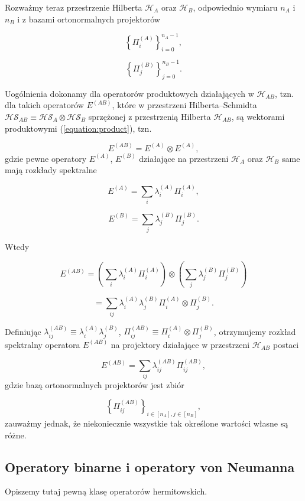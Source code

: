 Rozważmy teraz przestrzenie Hilberta $\mathcal{H}_{A}$ oraz $\mathcal{H}_{B}$, odpowiednio wymiaru $n_{A}$ i $n_{B}$ i z bazami ortonormalnych projektorów

$$
    \left\{\Pi_{i} ^ {(A)}\right\}_{i = 0} ^ {n_{A} - 1},
$$

$$
    \left\{\Pi_{j} ^ {(B)}\right\}_{j = 0} ^ {n_{B} - 1}.
$$

Uogólnienia dokonamy dla operatorów produktowych działających w $\mathcal{H}_{AB}$, tzn. dla takich operatorów $E ^ {(AB)}$, które w przestrzeni Hilberta--Schmidta $\mathcal{HS}_{AB} \equiv \mathcal{HS}_A \otimes \mathcal{HS}_B$ sprzężonej z przestrzenią Hilberta $\mathcal{H}_{AB}$, są wektorami produktowymi (\ref{equation:product}), tzn.

$$
    E ^ {(AB)} = E ^ {(A)} \otimes E ^ {(A)},
$$
gdzie pewne operatory $E ^ {(A)}$, $E ^ {(B)}$ działające na przestrzeni $\mathcal{H}_A$ oraz $\mathcal{H}_B$ same mają rozkłady spektralne

$$
    E ^ {(A)} = \sum\limits_{i} \lambda_{i} ^ {(A)} \Pi_{i} ^ {(A)},
$$

$$
    E ^ {(B)} = \sum\limits_{j} \lambda_{j} ^ {(B)} \Pi_{j} ^ {(B)}.
$$

Wtedy

$$
    E ^ {(AB)} = \left(\sum\limits_{i} \lambda_{i} ^ {(A)} \Pi_{i} ^ {(A)}\right) \otimes \left(\sum\limits_{j} \lambda_{j} ^ {(B)} \Pi_{j} ^ {(B)}\right)
$$

$$
    = \sum\limits_{ij} \lambda_{i} ^ {(A)} \lambda_{j} ^ {(B)} \Pi_{i} ^ {(A)} \otimes \Pi_{j} ^ {(B)}.
$$

Definiując $\lambda_{ij} ^ {(AB)} \equiv \lambda_{i} ^ {(A)} \lambda_{j} ^ {(B)}$, $\Pi_{ij} ^ {(AB)} \equiv \Pi_{i} ^ {(A)} \otimes \Pi_{j} ^ {(B)}$, otrzymujemy rozkład spektralny operatora $E ^ {(AB)}$ na projektory działające w przestrzeni $\mathcal{H}_{AB}$ postaci

$$
    E ^ {(AB)} = \sum\limits_{ij} \lambda_{ij} ^ {(AB)} \Pi_{ij} ^ {(AB)},
$$
gdzie bazą ortonormalnych projektorów jest zbiór

$$
    \left\{\Pi_{ij} ^ {(AB)}\right\}_{i \in [n_{A}], j \in [n_{B}]},
$$
zauważmy jednak, że niekoniecznie wszystkie tak określone wartości własne są różne.

\subsection{Operatory binarne i operatory von Neumanna}

Opiszemy tutaj pewną klasę operatorów hermitowskich.

